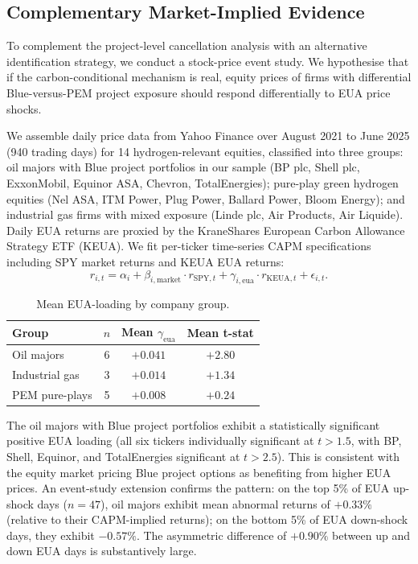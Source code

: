 \subsection{Complementary Market-Implied Evidence}
\label{sec:ch7-event-study}

To complement the project-level cancellation analysis with an alternative identification strategy, we conduct a stock-price event study. We hypothesise that if the carbon-conditional mechanism is real, equity prices of firms with differential Blue-versus-PEM project exposure should respond differentially to EUA price shocks.

We assemble daily price data from Yahoo Finance over August 2021 to June 2025 (940 trading days) for 14 hydrogen-relevant equities, classified into three groups: oil majors with Blue project portfolios in our sample (BP plc, Shell plc, ExxonMobil, Equinor ASA, Chevron, TotalEnergies); pure-play green hydrogen equities (Nel ASA, ITM Power, Plug Power, Ballard Power, Bloom Energy); and industrial gas firms with mixed exposure (Linde plc, Air Products, Air Liquide). Daily EUA returns are proxied by the KraneShares European Carbon Allowance Strategy ETF (KEUA). We fit per-ticker time-series CAPM specifications including SPY market returns and KEUA EUA returns:
\begin{equation}
r_{i,t} = \alpha_i + \beta_{i,\mathrm{market}} \cdot r_{\mathrm{SPY},t} + \gamma_{i,\mathrm{eua}} \cdot r_{\mathrm{KEUA},t} + \epsilon_{i,t}.
\end{equation}

\begin{table}[h!]
\centering
\caption{Mean EUA-loading by company group.}
\begin{tabular}{lccc}
\toprule
Group & $n$ & Mean $\gamma_{\mathrm{eua}}$ & Mean t-stat \\
\midrule
Oil majors & 6 & $+0.041$ & $+2.80$ \\
Industrial gas & 3 & $+0.014$ & $+1.34$ \\
PEM pure-plays & 5 & $+0.008$ & $+0.24$ \\
\bottomrule
\end{tabular}
\label{tab:ch7-eua-loading}
\end{table}

The oil majors with Blue project portfolios exhibit a statistically significant positive EUA loading (all six tickers individually significant at $t > 1.5$, with BP, Shell, Equinor, and TotalEnergies significant at $t > 2.5$). This is consistent with the equity market pricing Blue project options as benefiting from higher EUA prices. An event-study extension confirms the pattern: on the top 5\% of EUA up-shock days ($n=47$), oil majors exhibit mean abnormal returns of $+0.33\%$ (relative to their CAPM-implied returns); on the bottom 5\% of EUA down-shock days, they exhibit $-0.57\%$. The asymmetric difference of $+0.90\%$ between up and down EUA days is substantively large.

